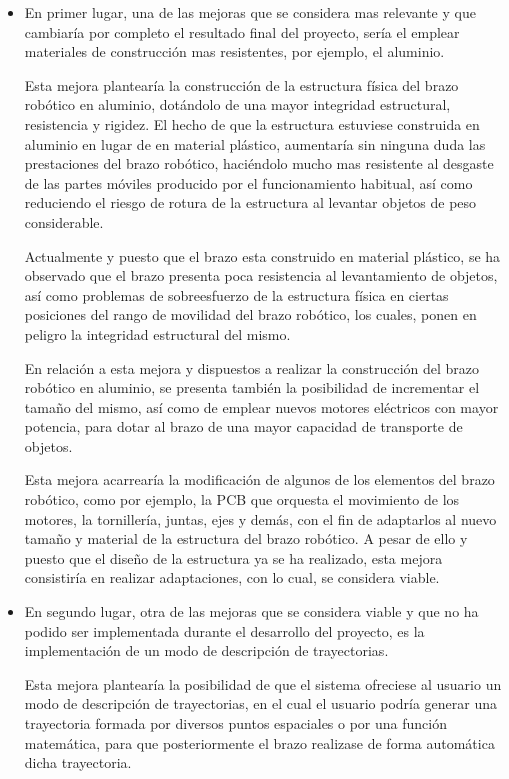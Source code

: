 \begin{itemize}
    \item En primer lugar, una de las mejoras que se considera mas relevante y que cambiaría por completo el resultado final del proyecto, sería el emplear materiales de construcción mas resistentes, por ejemplo, el aluminio.
    
    Esta mejora plantearía la construcción de la estructura física del brazo robótico en aluminio, dotándolo de una mayor integridad estructural, resistencia y rigidez. El hecho de que la estructura estuviese construida en aluminio en lugar de en material plástico, aumentaría sin ninguna duda las prestaciones del brazo robótico, haciéndolo mucho mas resistente al desgaste de las partes móviles producido por el funcionamiento habitual, así como reduciendo el riesgo de rotura de la estructura al levantar objetos de peso considerable.
    
    Actualmente y puesto que el brazo esta construido en material plástico, se ha observado que el brazo presenta poca resistencia al levantamiento de objetos, así como problemas de sobreesfuerzo de la estructura física en ciertas posiciones del rango de movilidad del brazo robótico, los cuales, ponen en peligro la integridad estructural del mismo.
    
    En relación a esta mejora y dispuestos a realizar la construcción del brazo robótico en aluminio, se presenta también la posibilidad de incrementar el tamaño del mismo, así como de emplear nuevos motores eléctricos con mayor potencia, para dotar al brazo de una mayor capacidad de transporte de objetos.
    
    Esta mejora acarrearía la modificación de algunos de los elementos del brazo robótico, como por ejemplo, la PCB que orquesta el movimiento de los motores, la tornillería, juntas, ejes y demás, con el fin de adaptarlos al nuevo tamaño y material de la estructura del brazo robótico. A pesar de ello y puesto que el diseño de la estructura ya se ha realizado, esta mejora consistiría en realizar adaptaciones, con lo cual, se considera viable.
    
    \item En segundo lugar, otra de las mejoras que se considera viable y que no ha podido ser implementada durante el desarrollo del proyecto, es la implementación de un modo de descripción de trayectorias.
    
    Esta mejora plantearía la posibilidad de que el sistema ofreciese al usuario un modo de descripción de trayectorias, en el cual el usuario podría generar una trayectoria formada por diversos puntos espaciales o por una función matemática, para que posteriormente el brazo realizase de forma automática dicha trayectoria.
    

\end{itemize}
